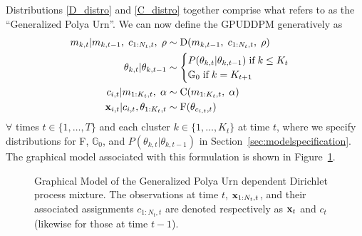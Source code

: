 \documentclass[twocolumn, final]{svjour3}
\begin{document}
Distributions \eqref{D_distro} and \eqref{C_distro} together comprise what \cite{caron_2007} refers to as the ``Generalized Polya Urn''. We can now define the GPUDDPM generatively as
\begin{align}
\label{gpuddpm_def}
\begin{split}
m_{k,t} | m_{k,t-1}, \hspace{1mm} c_{1:N_{t}, t}, \hspace{1mm} \rho  &\sim \text{D}(m_{k,t-1}, \hspace{1mm} c_{1:N_{t}, t}, \hspace{1mm} \rho) \\
\theta_{k, t} | \theta_{k, t-1}   & \sim
\begin{cases}
  P(\theta_{k, t} | \theta_{k, t-1}) \hspace{1mm} \text{if} \hspace{1mm} k \leq K_{t} \\ %
  \mathbb{G}_{0} \hspace{1mm} \text{if} \hspace{1mm} k = K_{t+1}
\end{cases} \\
c_{i,t} | m_{1:K_{t},t}, \hspace{1mm} \alpha  &\sim  \text{C} (m_{1:K_{t},t}, \hspace{1mm} \alpha) \\
\bold{x}_{i,t} | c_{i,t}, \theta_{1:K_{t}, t} &\sim \text{F}(\theta_{c_{i,t}, t})
\end{split}
\end{align}
$\forall$ times $t \in \{1, \ldots, T\}$ and each cluster $k \in \{ 1, \ldots, K_{t} \}$ at time $t$, where we specify distributions for F, $\mathbb{G}_{0}$, and $P(\theta_{k, t} | \theta_{k, t-1})$ in Section~\ref{sec:modelspecification}. The graphical model associated with this formulation is shown in Figure~\ref{fig:gpuddpm_gm_1}.
\begin{figure}[h]
        \caption{\label{fig:gpuddpm_gm_1} Graphical Model of the Generalized Polya Urn dependent Dirichlet process mixture. The observations at time $t$, $\bold{x}_{1:N_{t},t}$, and their associated assignments $c_{1:N_{t},t}$ are denoted respectively as $\bold{x}_{t}$ and $c_{t}$ (likewise for those at time $t-1$).}
\end{figure}
\end{document}
